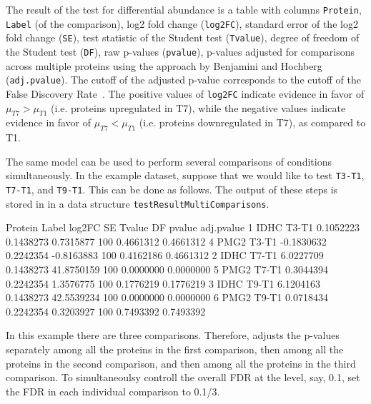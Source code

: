 \documentclass[11pt]{article}
\begin{document}
The result of the test for differential abundance is a table with columns {\tt Protein}, {\tt Label} (of the comparison), log2 fold change ({\tt log2FC}), standard error of the log2 fold change ({\tt SE}), test statistic of the Student test ({\tt Tvalue}), degree of freedom of the Student test ({\tt DF}), raw p-values ({\tt pvalue}), p-values adjusted for comparisons across multiple proteins using the approach by Benjamini and Hochberg ({\tt adj.pvalue}). The cutoff of the adjusted p-value corresponds to the cutoff of the False Discovery Rate~\citep{Benjamini:1995}. The positive values of {\tt log2FC} indicate evidence in favor of $\mu_{T7} > \mu_{T1}$ (i.e. proteins upregulated in T7), while the negative values  indicate evidence in favor of $\mu_{T7} < \mu_{T1}$ (i.e. proteins downregulated in T7), as compared to T1.

The same model can be used to perform several comparisons of conditions simultaneously. In the example dataset, suppose that we would like to test {\tt T3-T1}, {\tt T7-T1}, and {\tt T9-T1}. This can be done as follows. The output of these steps is stored in \m in a data structure {\tt testResultMultiComparisons}.

\begin{small}
\begin{Schunk}
\begin{Soutput}
  Protein Label     log2FC        SE     Tvalue  DF    pvalue adj.pvalue
1    IDHC T3-T1  0.1052223 0.1438273  0.7315877 100 0.4661312  0.4661312
4    PMG2 T3-T1 -0.1830632 0.2242354 -0.8163883 100 0.4162186  0.4661312
2    IDHC T7-T1  6.0227709 0.1438273 41.8750159 100 0.0000000  0.0000000
5    PMG2 T7-T1  0.3044394 0.2242354  1.3576775 100 0.1776219  0.1776219
3    IDHC T9-T1  6.1204163 0.1438273 42.5539234 100 0.0000000  0.0000000
6    PMG2 T9-T1  0.0718434 0.2242354  0.3203927 100 0.7493392  0.7493392
\end{Soutput}
\end{Schunk}
\end{small}
In this example there are three comparisons. Therefore, \m adjusts the p-values separately among all the proteins in the first comparison, then among all the proteins in the second comparison, and then among all the proteins in the third comparison. To simultaneoulsy controll the overall FDR at the level, say, 0.1, set the FDR in each individual comparison to 0.1/3.
\end{document}
